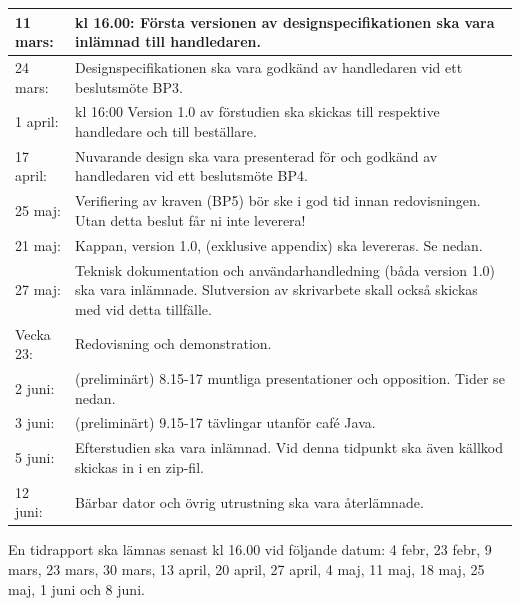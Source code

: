 \documentclass[11pt]{article}
\begin{document}
\begin{flushleft}
\begin{center}
\begin{longtable}{|l |p{.8\linewidth}|}
11 mars: & 
kl 16.00: Första versionen av designspecifikationen ska vara inlämnad till handledaren. \\ \hline

24 mars: &
Designspecifikationen ska vara godkänd av handledaren vid ett beslutsmöte BP3. \\ \hline

1 april: &
kl 16:00 Version 1.0 av förstudien ska skickas till respektive handledare och till beställare. \\ \hline

17 april: & 
Nuvarande design ska vara presenterad för och godkänd av handledaren vid ett beslutsmöte BP4. \\ \hline

25 maj: &
Verifiering av kraven (BP5) bör ske i god tid innan redovisningen. Utan detta beslut får ni inte leverera! \\ \hline

21 maj: &
Kappan, version 1.0, (exklusive appendix) ska levereras. Se nedan. \\ \hline

27 maj: &
Teknisk dokumentation och användarhandledning (båda version 1.0) ska vara inlämnade. Slutversion av skrivarbete skall också skickas med vid detta tillfälle. \\ \hline

Vecka 23: &
Redovisning och demonstration.\\ \hline

2 juni: &
(preliminärt) 8.15-17 muntliga presentationer och opposition. Tider se nedan. \\ \hline

3 juni: &
(preliminärt) 9.15-17 tävlingar utanför café Java. \\ \hline

5 juni: &
Efterstudien ska vara inlämnad. Vid denna tidpunkt ska även källkod skickas in i en zip-fil. \\ \hline

12 juni: &
Bärbar dator och övrig utrustning ska vara återlämnade. \\ \hline
\end{longtable}
\end{center}
En tidrapport ska lämnas senast kl 16.00 vid följande datum: 4 febr, 23 febr, 9 mars, 23 mars, 30 mars, 13 april, 20 april, 27 april, 4 maj, 11 maj, 18 maj, 25 maj, 1 juni och 8 juni.

\begin{center}
\begin{longtable}{|l|l|p{.70\linewidth}|l|} \hline


\end{longtable}
\end{center}
\end{flushleft}
\end{document}
